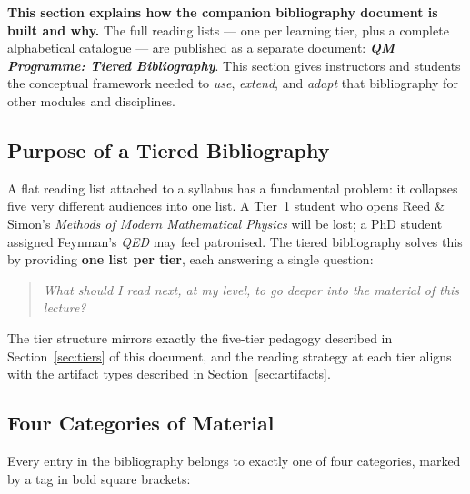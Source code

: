 \documentclass[11pt,a4paper]{article}
\begin{document}
\begin{tcolorbox}[goldbox]
\textbf{This section explains how the companion bibliography document is built and why.}
The full reading lists --- one per learning tier, plus a complete alphabetical catalogue
--- are published as a separate document: \textbf{\textit{QM Programme: Tiered Bibliography}}.
This section gives instructors and students the conceptual framework needed to
\emph{use}, \emph{extend}, and \emph{adapt} that bibliography for other modules and disciplines.
\end{tcolorbox}

\subsection{Purpose of a Tiered Bibliography}

A flat reading list attached to a syllabus has a fundamental problem: it collapses
five very different audiences into one list. A Tier~1 student who opens Reed \& Simon's
\textit{Methods of Modern Mathematical Physics} will be lost; a PhD student assigned
Feynman's \textit{QED} may feel patronised. The tiered bibliography solves this by
providing \textbf{one list per tier}, each answering a single question:
\begin{quote}\itshape
  What should I read \emph{next}, at \emph{my} level, to go deeper into the material
  of this lecture?
\end{quote}

\noindent The tier structure mirrors exactly the five-tier pedagogy described in
Section~\ref{sec:tiers} of this document, and the reading strategy at each tier
aligns with the artifact types described in Section~\ref{sec:artifacts}.

\subsection{Four Categories of Material}

Every entry in the bibliography belongs to exactly one of four categories,
marked by a tag in bold square brackets:
\end{document}
